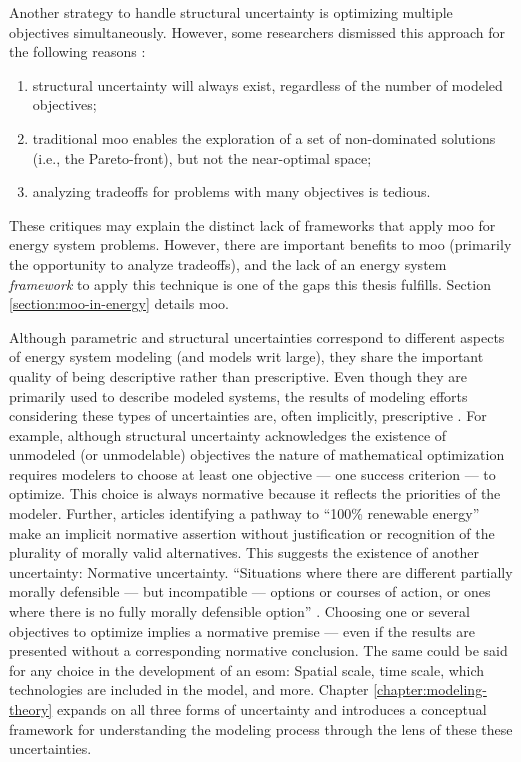 Another strategy to handle structural uncertainty is optimizing multiple
objectives simultaneously. However, some researchers dismissed this approach for
the following reasons \cite{decarolis_using_2011}:
\begin{enumerate}
    \item structural uncertainty will always exist, regardless of the number of
    modeled objectives;
    \item traditional \ac{moo} enables the exploration of a set of non-dominated
    solutions (i.e., the Pareto-front), but not the near-optimal space;
    \item analyzing tradeoffs for problems with many objectives is tedious.
\end{enumerate}
These critiques may explain the distinct lack of frameworks that apply \ac{moo}
for energy system problems. However, there are important benefits to \ac{moo}
(primarily the opportunity to analyze tradeoffs), and the lack of an energy
system \textit{framework} to apply this technique is one of the gaps this thesis
fulfills. Section \ref{section:moo-in-energy} details \acl{moo}.

Although parametric and structural uncertainties correspond to different aspects
of energy system modeling (and models writ large), they share the important
quality of being descriptive rather than prescriptive. Even though they are
primarily used to describe modeled systems, the results of modeling efforts
considering these types of uncertainties are, often implicitly, prescriptive
\cite{yue_least_2020,decarolis_nc_2018,cochran_la100_2021,bussar_optimal_2014}.
For example, although structural uncertainty acknowledges the existence of
unmodeled (or unmodelable) objectives the nature of mathematical optimization
requires modelers to choose at least one objective --- one success criterion ---
to optimize. This choice is always normative because it reflects the priorities
of the modeler. Further, articles identifying a pathway to ``100\% renewable
energy'' make an implicit normative assertion without justification or
recognition of the plurality of morally valid alternatives. This suggests the
existence of another uncertainty: Normative uncertainty. ``Situations where
there are different partially morally defensible --- but incompatible ---
options or courses of action, or ones where there is no fully morally defensible
option'' \cite{taebi_bridging_2017,van_uffelen_revisiting_2024}. Choosing one or
several objectives to optimize implies a normative premise --- even if the
results are presented without a corresponding normative conclusion. The same
could be said for any choice in the development of an \ac{esom}: Spatial scale,
time scale, which technologies are included in the model, and more. Chapter
\ref{chapter:modeling-theory} expands on all three forms of uncertainty and
introduces a conceptual framework for understanding the modeling process
through the lens of these these uncertainties. 



